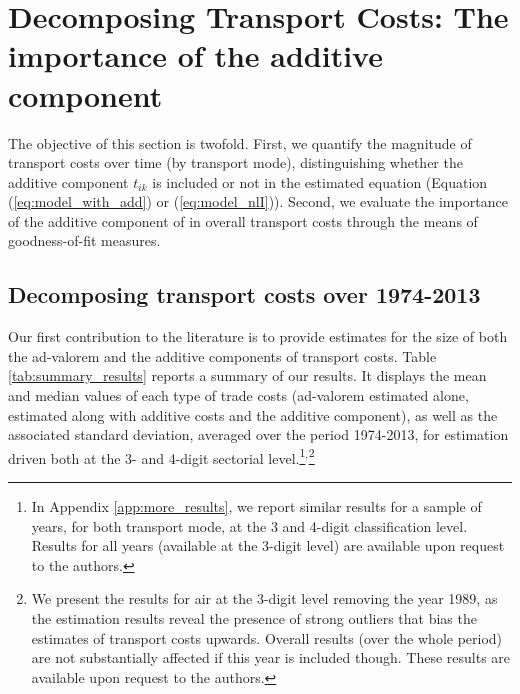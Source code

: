 \documentclass[a4paper,11pt]{article}
\begin{document}
\section{Decomposing Transport Costs: The importance of the additive component \label{sec:results_decomposition}}

The objective of this section is twofold. First, we quantify the magnitude of transport costs over time (by transport mode), distinguishing whether the additive component $t_{ik}$ is included or not in the estimated equation (Equation (\ref{eq:model_with_add}) or (\ref{eq:model_nlI})). Second, we evaluate the importance of the additive component of in overall transport costs through the means of goodness-of-fit measures.


\subsection{Decomposing transport costs over 1974-2013}

Our first contribution to the literature is to provide estimates for the size of both the ad-valorem and the additive components of transport costs. Table \ref{tab:summary_results} reports a summary of our results. It displays the mean and median values of each type of trade costs (ad-valorem estimated alone, estimated along with additive costs and the additive component), as well as the associated standard deviation, averaged over the period 1974-2013, for estimation driven both at the 3- and 4-digit sectorial level.\footnote{In Appendix \ref{app:more_results}, we report similar results for a sample of years, for both transport mode, at the 3 and 4-digit classification level. Results for all years (available at the 3-digit level) are available upon request to the authors.}$^{,}$\footnote{We present the results for air at the 3-digit level removing the year 1989, as the estimation results reveal the presence of strong outliers that bias the estimates of transport costs upwards. Overall results (over the whole period) are not substantially affected if this year is included though. These results are available upon request to the authors.}
\end{document}
